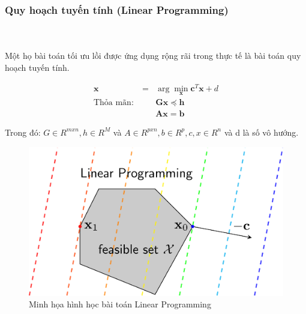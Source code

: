 \documentclass[a4paper, 12pt, oneside]{report}
\begin{document}
\subsubsection{Quy hoạch tuyến tính (Linear Programming)} \\ \\
Một họ bài toán tối ưu lồi được ứng dụng rộng rãi trong thực tế là bài toán quy hoạch tuyến tính. \\
    \begin{mybox}
    \begin{eqnarray}
\mathbf{x} &=& \arg\min_{\mathbf{x}} \mathbf{c}^T\mathbf{x} + d \\
\text{Thỏa mãn:}~ && \mathbf{Gx} \preceq \mathbf{h} \\
&& \mathbf{Ax} = \mathbf{b}
\end{eqnarray}
\end{mybox}
Trong đó: $G \in R^{mxn}, h\in R^M$ và $A \in R^{pxn}, b \in R^p, c,x \in R^n$ và d là số vô hướng.\\ 
\begin{center}
    \begin{figure}[H]
    \begin{center}
     \includegraphics[scale=0.2]{lp.png}
    \end{center}
    \caption{Minh họa hình học bài toán Linear Programming}
    \label{refhinh1}
    \end{figure}
\end{center}
\end{document}
